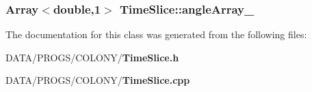 \subsubsection{\setlength{\rightskip}{0pt plus 5cm}Array$<$double,1$>$ {\bf TimeSlice::angleArray\_\-}}\label{classTimeSlice_d2b7c4bafaf47db7bfe3b4d922fc9c85}




The documentation for this class was generated from the following files:\begin{CompactItemize}
\item 
DATA/PROGS/COLONY/{\bf TimeSlice.h}\item 
DATA/PROGS/COLONY/{\bf TimeSlice.cpp}\end{CompactItemize}
